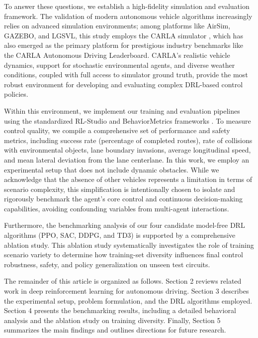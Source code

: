 \documentclass[sn-mathphys,Numbered]{sn-jnl}
\begin{document}
To answer these questions, we establish a high-fidelity simulation and evaluation framework. The validation of modern autonomous vehicle algorithms increasingly relies on advanced simulation environments; among platforms like AirSim, GAZEBO, and LGSVL, this study employs the CARLA simulator \citep{dosovitskiy2017carla}, which has also emerged as the primary platform for prestigious industry benchmarks like the CARLA Autonomous Driving Leaderboard. CARLA's realistic vehicle dynamics, support for stochastic environmental agents, and diverse weather conditions, coupled with full access to simulator ground truth, provide the most robust environment for developing and evaluating complex DRL-based control policies.

Within this environment, we implement our training and evaluation pipelines using the standardized RL-Studio and BehaviorMetrics frameworks \citep{paniego2024behaviormetrics}. To measure control quality, we compile a comprehensive set of performance and safety metrics, including success rate (percentage of completed routes), rate of collisions with environmental objects, lane boundary invasions, average longitudinal speed, and mean lateral deviation from the lane centerlane. In this work, we employ an experimental setup that does not include dynamic obstacles. While we acknowledge that the absence of other vehicles represents a limitation in terms of scenario complexity, this simplification is intentionally chosen to isolate and rigorously benchmark the agent's core control and continuous decision-making capabilities, avoiding confounding variables from multi-agent interactions.

Furthermore, the benchmarking analysis of our four candidate model-free DRL algorithms (PPO, SAC, DDPG, and TD3) is supported by a comprehensive ablation study. This ablation study systematically investigates the role of training scenario variety to determine how training-set diversity influences final control robustness, safety, and policy generalization on unseen test circuits.

The remainder of this article is organized as follows. Section 2 reviews related work in deep reinforcement learning for autonomous driving. Section 3 describes the experimental setup, problem formulation, and the DRL algorithms employed. Section 4 presents the benchmarking results, including a detailed behavioral analysis and the ablation study on training diversity. Finally, Section 5 summarizes the main findings and outlines directions for future research.
\end{document}
